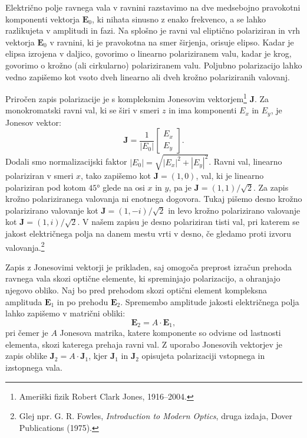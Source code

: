 Električno polje ravnega vala v ravnini razstavimo na dve medsebojno 
pravokotni komponenti vektorja $\mathbf{E}_0$, ki
nihata sinusno z enako frekvenco, a se lahko razlikujeta v amplitudi in fazi. 
Na splošno je ravni val eliptično polariziran in
vrh vektorja $\mathbf E_0$ v ravnini, ki je pravokotna 
na smer širjenja, orisuje elipso. Kadar je elipsa izrojena v daljico,
govorimo o linearno polariziranem valu,
kadar je krog, govorimo o krožno (ali cirkularno) polariziranem valu. 
Poljubno polarizacijo lahko vedno zapišemo kot vsoto dveh linearno ali dveh 
krožno polariziranih valovanj. 

Priročen zapis polarizacije je s kompleksnim Jonesovim 
vektorjem\footnote{Ameriški fizik Robert Clark Jones, 1916--2004.}
$\mathbf{J}$. Za monokromatski ravni val, ki se širi v smeri $z$ in ima 
komponenti $E_x$ in $E_y$, je Jonesov vektor:
\begin{equation}
\mathbf{J}=\frac{1}{|E_{0}|}\left[\begin{array}{c}
E_{x}\\
E_{y}
\end{array}\right]\!\!.
\end{equation}
Dodali smo normalizacijski faktor $|E_{0}|=\sqrt{|E_{x}|^{2}+|E_{y}|^{2}}$.
Ravni val, linearno polariziran v smeri $x$, tako zapišemo kot $\mathbf{J}=\left(1,0\right)$,
val, ki je linearno polariziran pod kotom $\ang{45}$ glede na osi
$x$ in $y$, pa je $\mathbf{J}=\left(1,1\right)/\sqrt{2}$.
Za zapis krožno polariziranega valovanja ni enotnega dogovora. Tukaj pišemo
desno krožno polarizirano valovanje kot 
$\mathbf{J}=\left(1,-i\right)/\sqrt{2}$ in
levo krožno polarizirano valovanje kot $\mathbf{J}=\left(1,i\right)/\sqrt{2}$.
V našem zapisu je desno polariziran tisti val, pri katerem se jakost električnega
polja na danem mestu vrti v desno, če gledamo proti izvoru valovanja.\footnote{Glej 
npr. G. R. Fowles, {\it Introduction to Modern Optics}, druga izdaja, Dover Publications (1975).}

Zapis z Jonesovimi vektorji je prikladen, saj omogoča preprost izračun
prehoda ravnega vala skozi optične elemente, ki spreminjajo polarizacijo,
a ohranjajo njegovo obliko. Naj bo pred prehodom skozi optični element kompleksna
amplituda $\mathbf{E}_1$ in po prehodu $\mathbf{E}_2$. Spremembo amplitude 
jakosti električnega polja lahko zapišemo v matrični obliki:
\begin{equation}
\mathbf{E}_{2}=A\cdot\mathbf{E}_{1},
\end{equation}
pri čemer je $A$ Jonesova matrika, katere komponente so odvisne od
lastnosti elementa, skozi katerega prehaja ravni val. 
Z uporabo Jonesovih vektorjev je zapis oblike $\mathbf{J}_{2}=A\cdot\mathbf{J}_{1}$, 
kjer $\mathbf{J}_{1}$ in $\mathbf{J}_{2}$ opisujeta polarizaciji vstopnega in izstopnega vala. 

